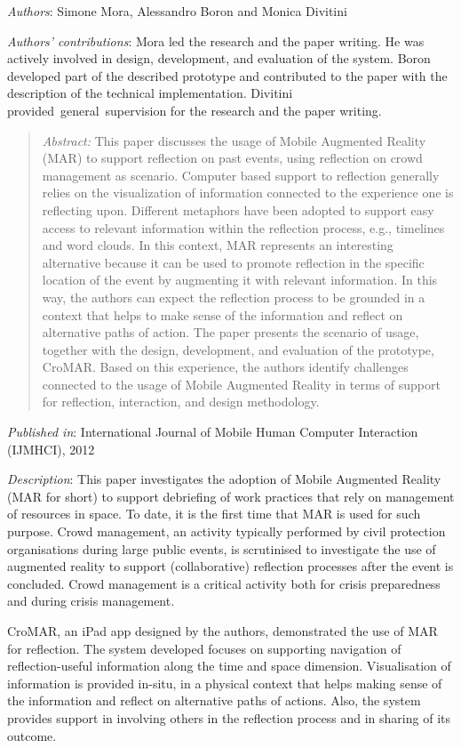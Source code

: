 \emph{Authors}: Simone Mora, Alessandro Boron and Monica Divitini

\emph{Authors' contributions}: Mora led the research and the paper writing. He was actively involved in design, development, and evaluation of the system. Boron developed part of the described prototype and contributed to the paper with the description of the technical implementation. Divitini provided~general~supervision for the research and the paper writing. 
\begin{quote}
	\emph{Abstract:} This paper discusses the usage of Mobile Augmented Reality (MAR) to support reflection on past events, using reflection on crowd management as scenario. Computer based support to reflection generally relies on the visualization of information connected to the experience one is reflecting upon. Different metaphors have been adopted to support easy access to relevant information within the reflection process, e.g., timelines and word clouds. In this context, MAR represents an interesting alternative because it can be used to promote reflection in the specific location of the event by augmenting it with relevant information. In this way, the authors can expect the reflection process to be grounded in a context that helps to make sense of the information and reflect on alternative paths of action. The paper presents the scenario of usage, together with the design, development, and evaluation of the prototype, CroMAR. Based on this experience, the authors identify challenges connected to the usage of Mobile Augmented Reality in terms of support for reflection, interaction, and design methodology. 
\end{quote}

\emph{Published in}: International Journal of Mobile Human Computer Interaction (IJMHCI), 2012

\emph{Description}: This paper investigates the adoption of Mobile Augmented Reality (MAR for short) to support debriefing of work practices that rely on management of resources in space. To date, it is the first time that MAR is used for such purpose. Crowd management, an activity typically performed by civil protection organisations during large public events, is scrutinised to investigate the use of augmented reality to support (collaborative) reflection processes after the event is concluded. Crowd management is a critical activity both for crisis preparedness and during crisis management.

CroMAR, an iPad app designed by the authors, demonstrated the use of MAR for reflection. The system developed focuses on supporting navigation of reflection-useful information along the time and space dimension. Visualisation of information is provided in-situ, in a physical context that helps making sense of the information and reflect on alternative paths of actions. Also, the system provides support in involving others in the reflection process and in sharing of its outcome.


